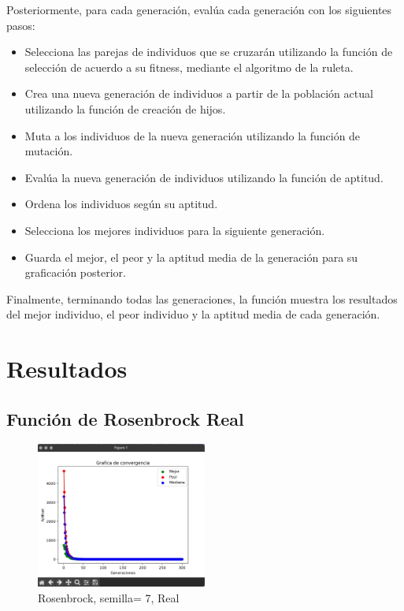 \documentclass{report}
\begin{document}
    Posteriormente, para cada generación, evalúa cada generación con los siguientes pasos:
    \begin{itemize}
        \item Selecciona las parejas de individuos que se cruzarán utilizando la función de selección de acuerdo a su fitness, mediante el algoritmo de la ruleta.
        \item Crea una nueva generación de individuos a partir de la población actual utilizando la función de creación de hijos.
        \item Muta a los individuos de la nueva generación utilizando la función de mutación.
        \item Evalúa la nueva generación de individuos utilizando la función de aptitud.
        \item Ordena los individuos según su aptitud.
        \item Selecciona los mejores individuos para la siguiente generación.
        \item Guarda el mejor, el peor y la aptitud media de la generación para su graficación posterior.
    \end{itemize}

    Finalmente, terminando todas las generaciones, la función muestra los resultados del mejor individuo, el peor individuo y la aptitud media de cada generación.

    \newpage

    \section*{Resultados}
    \subsection*{Función de Rosenbrock Real}
    \begin{figure}[htbp]
        \centering
        \includegraphics[width=0.5\textwidth]{rosenbrock_7_re.jpeg}
        \caption{Rosenbrock, semilla= 7, Real}
    \end{figure}
\end{document}
